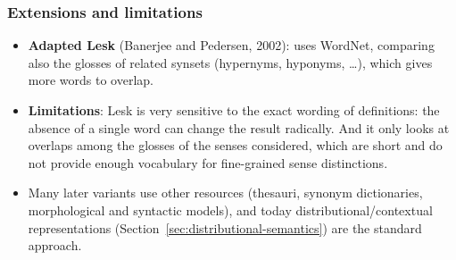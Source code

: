 \subsubsection{Extensions and limitations}

\begin{itemize}
  \item \textbf{Adapted Lesk} (Banerjee and Pedersen, 2002): uses WordNet, comparing
        also the glosses of related synsets (hypernyms, hyponyms, \ldots), which gives
        more words to overlap.
  \item \textbf{Limitations}: Lesk is very sensitive to the exact wording of
        definitions: the absence of a single word can change the result radically. And it
        only looks at overlaps among the glosses of the senses considered, which are
        short and do not provide enough vocabulary for fine-grained sense distinctions.
  \item Many later variants use other resources (thesauri, synonym dictionaries,
        morphological and syntactic models), and today distributional/contextual
        representations (Section~\ref{sec:distributional-semantics}) are the standard
        approach.
\end{itemize}
